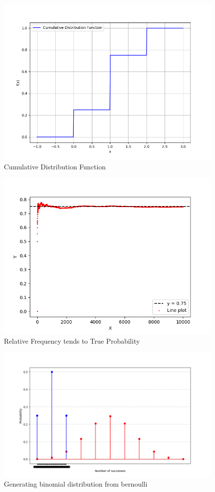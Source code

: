 \documentclass[journal]{IEEEtran}
\begin{document}
\begin{figure}[h!]
   \centering
   \includegraphics[width=0.7\columnwidth]{figs/fig2.png}
    \caption{Cumulative Distribution Function}
\end{figure}
\begin{figure}[h!]
   \centering
   \includegraphics[width=0.7\columnwidth]{figs/fig.png}
    \caption{Relative Frequency tends to True Probability}
\end{figure}
\begin{figure}[h!]
   \centering
   \includegraphics[width=0.7\columnwidth]{figs/binomial.png}
    \caption{Generating binomial distribution from bernoulli}
\end{figure}
\end{document}
